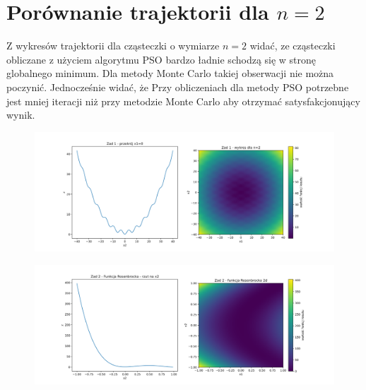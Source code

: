 \documentclass[11pt, a4paper, oneside]{article}
\begin{document}
\section{Porównanie trajektorii dla $n = 2$}
Z wykresów trajektorii dla cząsteczki o wymiarze $n=2$ widać, ze cząsteczki obliczane z użyciem algorytmu PSO bardzo ładnie schodzą się w stronę globalnego minimum. Dla metody Monte Carlo takiej obserwacji nie można poczynić. Jednocześnie widać, że Przy obliczeniach dla metody PSO potrzebne jest mniej iteracji niż przy metodzie Monte Carlo aby otrzymać satysfakcjonujący wynik.

\begin{figure}[H]
\centerline{\includegraphics[width=\dimexpr.9\textwidth-1em]{grafiki//Wykresy2d/Zad1_2d_heatmap.png}}
\label{fig:zad1:koszt2d}
\end{figure}

\begin{figure}[H]
\centerline{\includegraphics[width=\dimexpr.9\textwidth-1em]{grafiki//Wykresy2d/Rosenbrock_2d_heatmap_close_min.png}} 
\label{fig:zad1:koszt2d}
\end{figure}
\end{document}
